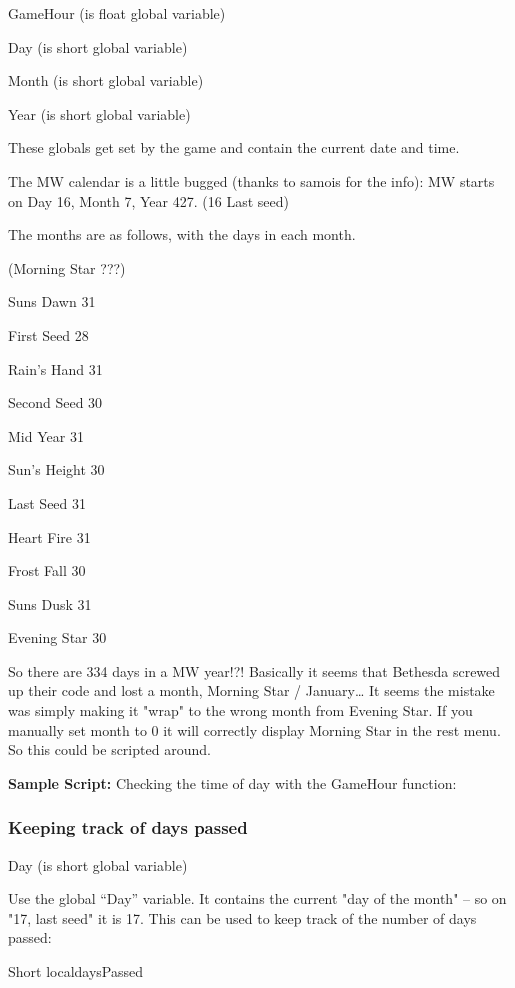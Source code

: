 GameHour (is float global variable)

Day (is short global variable)

Month (is short global variable)

Year (is short global variable)

These globals get set by the game and contain the current date and time.

The MW calendar is a little bugged (thanks to samois for the info): MW
starts on Day 16, Month 7, Year 427. (16 Last seed)

The months are as follows, with the days in each month.

(Morning Star ???)

Suns Dawn 31

First Seed 28

Rain's Hand 31

Second Seed 30

Mid Year 31

Sun's Height 30

Last Seed 31

Heart Fire 31

Frost Fall 30

Suns Dusk 31

Evening Star 30

So there are 334 days in a MW year!?! Basically it seems that Bethesda
screwed up their code and lost a month, Morning Star / January\ldots{}
It seems the mistake was simply making it "wrap" to the wrong month from
Evening Star. If you manually set month to 0 it will correctly display
Morning Star in the rest menu. So this could be scripted around.

\textbf{Sample Script:} Checking the time of day with the GameHour
function:



\hypertarget{keeping-track-of-days-passed}{%
\subsubsection{Keeping track of days
passed}\label{keeping-track-of-days-passed}}

Day (is short global variable)

Use the global ``Day'' variable. It contains the current "day of the
month" -- so on "17, last seed" it is 17. This can be used to keep track
of the number of days passed:

Short localdaysPassed

